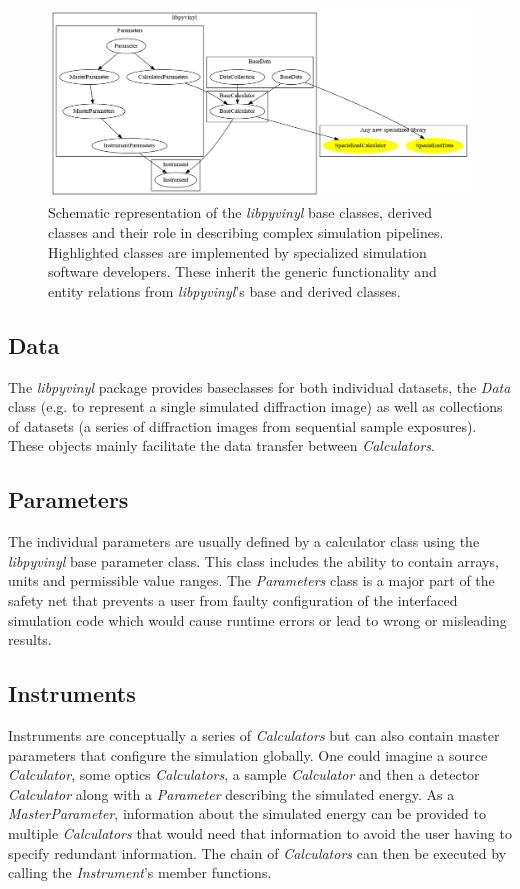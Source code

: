 \documentclass[11pt, a4paper]{article}
\begin{document}
\begin{figure}[ht]
  \centering
  \includegraphics[width=.8\textwidth]{figures/libpyvinyl_classes_relations.png}
  \caption[\textit{libpyvinyl} schema]{Schematic representation of the
    \textit{libpyvinyl} base classes, derived classes and their role in
    describing complex simulation pipelines. Highlighted classes are implemented
  by specialized simulation software developers. These inherit the generic
  functionality and entity relations from \textit{libpyvinyl}'s base and derived classes.}
  \label{fig:libpyvinyl_classes_schema}
\end{figure}

\subsection{Data}
\label{sec:data}
The \textit{libpyvinyl} package provides baseclasses for both individual
datasets, the \textit{Data} class (e.g. to represent a single simulated diffraction image)
as well as  collections of datasets (a series of diffraction images from
 sequential sample exposures). These objects  mainly facilitate the data transfer between \textit{Calculators}.

\subsection{Parameters}
\label{sec:parameters}
The individual parameters are usually defined by a calculator class using the
\textit{libpyvinyl} base parameter class. This class includes the ability to
contain arrays, units and permissible value ranges. The \textit{Parameters}
class is a major part of the safety net that prevents a user from faulty
configuration of the interfaced simulation code which would cause runtime
errors or lead to wrong or misleading results.

\subsection{Instruments}
\label{sec:instruments}
Instruments are conceptually a series of \textit{Calculators} but can also contain 
master parameters that configure the simulation globally.
One could imagine a source \textit{Calculator}, some optics
\textit{Calculators}, a sample \textit{Calculator} and then a detector \textit{Calculator} along with a
\textit{Parameter} describing the simulated energy. As a \textit{MasterParameter}, information
about the simulated energy can be provided to multiple \textit{Calculators} that would
need that information to avoid the user having to specify redundant information.
The chain of \textit{Calculators} can then be executed by calling the
\textit{Instrument}'s member functions.
\end{document}
